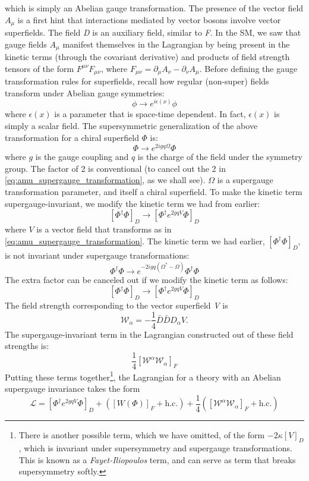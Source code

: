 which is simply an Abelian gauge transformation. The presence of the vector field $A_\mu$ is a first hint that interactions mediated by vector bosons involve vector superfields. The field \emph{D} is an auxiliary field, similar to \emph{F}. 
In the SM, we saw that gauge fields $A_\mu$ manifest themselves in the Lagrangian by being present in the kinetic terms (through the covariant derivative) and products of field strength tensors of the form $F^{\mu\nu}F_{\mu\nu}$, where $F_{\mu\nu} = \partial_\mu A_\nu-\partial_\nu A_\mu$.
Before defining the gauge transformation rules for superfields, recall how regular (non-super) fields transform under Abelian gauge symmetries:
\[\phi\rightarrow e^{i\epsilon(x)}\phi\]
where $\epsilon(x)$ is a parameter that is space-time dependent. In fact, $\epsilon(x)$ is simply a scalar field. The supersymmetric generalization of the above transformation for a chiral superfield $\Phi$ is:
\[\Phi\rightarrow e^{2igq\Omega}\Phi\]
where $g$ is the gauge coupling and $q$ is the charge of the field under the symmetry group. The factor of 2 is conventional (to cancel out the 2 in \eqref{eq:amu_supergauge_transformation}, as we shall see). $\Omega$ is a supergauge transformation parameter, and itself a chiral superfield.
To make the kinetic term supergauge-invariant, we modify the kinetic term we had from earlier:
\[[\Phi^\dagger\Phi]_D \rightarrow [\Phi^\dagger e^{2gqV}\Phi]_D\]
where $V$ is a vector field that transforms as in \eqref{eq:amu_supergauge_transformation}. The kinetic term we had earlier, $[\Phi^\dagger\Phi]_D$, is not invariant under supergauge transformations:
\[\Phi^\dagger\Phi\rightarrow e^{-2igq(\Omega^*-\Omega)}\Phi^\dagger\Phi\]
The extra factor can be canceled out if we modify the kinetic term as follows:
\[[\Phi^\dagger\Phi]_D\rightarrow[\Phi^\dagger e^{2gqV}\Phi]_D\]
The field strength corresponding to the vector superfield \emph{V} is
\[\mathcal{W}_\alpha=-\frac{1}{4}\bar{D}\bar{D}D_\alpha V.\]
The supergauge-invariant term in the Lagrangian constructed out of these field strengths is:
\[\frac{1}{4}[\mathcal{W}^\alpha\mathcal{W}_\alpha]_F\]
Putting these terms together\footnote{There is another possible term, which we have omitted, of the form $-2\kappa[V]_D$, which is invariant under supersymmetry and supergauge transformations. This is known as a \emph{Fayet-Iliopoulos} term, and can serve as term that breaks supersymmetry softly.}, the Lagrangian for a theory with an Abelian supergauge invariance takes the form
\begin{equation*}
  \mathcal{L} = \left[\Phi^\dagger e^{2gqV}\Phi\right]_D + \left([W(\Phi)]_F + \text{h.c.}\right) + \frac{1}{4}\left([\mathcal{W}^\alpha\mathcal{W}_\alpha]_F + \text{h.c.}\right)
\end{equation*}
